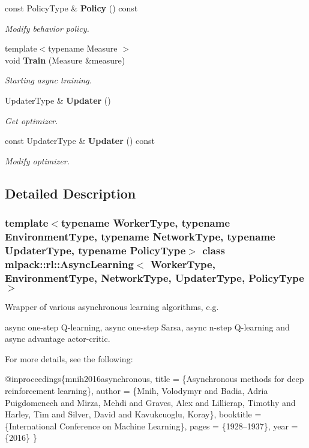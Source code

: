 \begin{DoxyCompactItemize}
const Policy\+Type \& \textbf{ Policy} () const
\begin{DoxyCompactList}\small\item\em Modify behavior policy. \end{DoxyCompactList}\item 
{\footnotesize template$<$typename Measure $>$ }\\void \textbf{ Train} (Measure \&measure)
\begin{DoxyCompactList}\small\item\em Starting async training. \end{DoxyCompactList}\item 
Updater\+Type \& \textbf{ Updater} ()
\begin{DoxyCompactList}\small\item\em Get optimizer. \end{DoxyCompactList}\item 
const Updater\+Type \& \textbf{ Updater} () const
\begin{DoxyCompactList}\small\item\em Modify optimizer. \end{DoxyCompactList}\end{DoxyCompactItemize}


\subsection{Detailed Description}
\subsubsection*{template$<$typename Worker\+Type, typename Environment\+Type, typename Network\+Type, typename Updater\+Type, typename Policy\+Type$>$\newline
class mlpack\+::rl\+::\+Async\+Learning$<$ Worker\+Type, Environment\+Type, Network\+Type, Updater\+Type, Policy\+Type $>$}

Wrapper of various asynchronous learning algorithms, e.\+g. 

async one-\/step Q-\/learning, async one-\/step Sarsa, async n-\/step Q-\/learning and async advantage actor-\/critic.

For more details, see the following\+: 
\begin{DoxyCode}
@inproceedings\{mnih2016asynchronous,
  title     = \{Asynchronous methods \textcolor{keywordflow}{for} deep reinforcement learning\},
  author    = \{Mnih, Volodymyr and Badia, Adria Puigdomenech and Mirza,
               Mehdi and Graves, Alex and Lillicrap, Timothy and Harley,
               Tim and Silver, David and Kavukcuoglu, Koray\},
  booktitle = \{International Conference on Machine Learning\},
  pages     = \{1928--1937\},
  year      = \{2016\}
\}
\end{DoxyCode}



